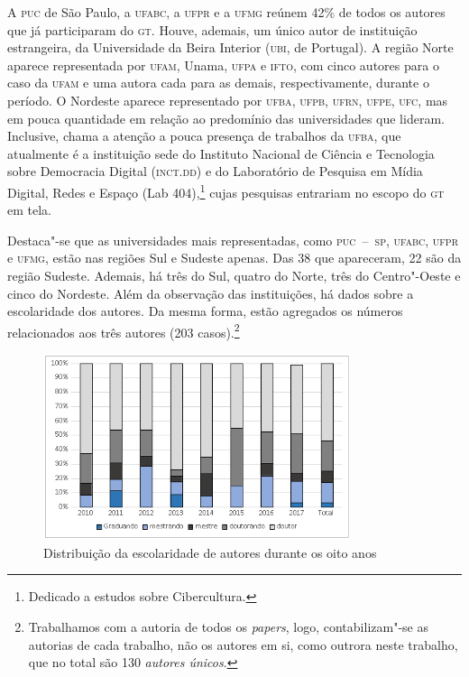 { 

A \textsc{puc} de São Paulo, a \textsc{ufabc}, a \textsc{ufpr} e a \textsc{ufmg} reúnem 42\% de todos os
autores que já participaram do \textsc{gt}. Houve, ademais, um único autor de
instituição estrangeira, da Universidade da Beira Interior (\textsc{ubi}, de Portugal). A região Norte aparece representada por \textsc{ufam}, Unama, \textsc{ufpa} e
\textsc{ifto}, com cinco autores para o caso da \textsc{ufam} e uma autora cada para as
demais, respectivamente, durante o período. O Nordeste aparece
representado por \textsc{ufba}, \textsc{ufpb}, \textsc{ufrn}, \textsc{ufpe}, \textsc{ufc}, mas em pouca quantidade em
relação ao predomínio das universidades que lideram. Inclusive, chama a
atenção a pouca presença de trabalhos da \textsc{ufba}, que atualmente é a
instituição sede do Instituto Nacional de Ciência e Tecnologia sobre
Democracia Digital (\textsc{inct}.\textsc{dd}) e do Laboratório de Pesquisa em Mídia
Digital, Redes e Espaço (Lab 404),\footnote{Dedicado a estudos sobre
  Cibercultura.} cujas pesquisas entrariam no escopo do \textsc{gt} em
tela.

Destaca"-se que as universidades mais representadas, como \textsc{puc~--~sp}, \textsc{ufabc}, \textsc{ufpr}
e \textsc{ufmg}, estão nas regiões Sul e Sudeste apenas. Das 38 que apareceram,
22 são da região Sudeste. Ademais, há três do Sul, quatro do Norte, três
do Centro"-Oeste e cinco do Nordeste. Além da observação das
instituições, há dados sobre a escolaridade dos autores. Da mesma
forma, estão agregados os números relacionados aos três autores
(203 casos).\footnote{Trabalhamos com a autoria de todos os
  \textit{papers}, logo, contabilizam"-se as autorias de cada trabalho, não
  os autores em si, como outrora neste trabalho, que no total são 130
  \textit{autores únicos}.}



 \begin{figure}[!ht]
 \centering
  \includegraphics[width=90mm]{./imgs/graf3_3.png}
 \caption{Distribuição da escolaridade de autores durante os oito anos\footnotemark}
 \end{figure}
 
}
